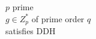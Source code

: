 \documentclass[varwidth,convert={size=1000x}]{standalone}
\begin{document}
$p$ prime\\
$g \in Z_p^*$ of prime order $q$\\
satisfies DDH
\end{document}

